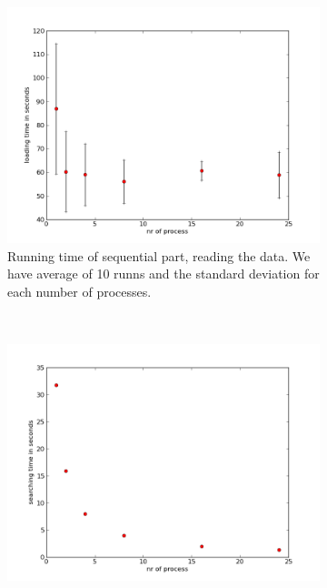 \documentclass[a4paper,10pt]{article}
\begin{document}
\begin{figure}[h!t]
        \centering
        \begin{subfigure}[b]{0.70\textwidth}
                \centering
                \includegraphics[width=\textwidth]{graphics/openmp17gb/load_time.png}
                \caption{Running time of sequential part, reading the data. 
                         We have average of 10 runns and the standard deviation for each number
                         of processes.}
                \label{fig:openmp_load}
        \end{subfigure}%
        \\
        \begin{subfigure}[b]{0.70\textwidth}
                \centering
                \includegraphics[width=\textwidth]{graphics/openmp17gb/search_time.png}

\end{subfigure}
\end{figure}
\end{document}
